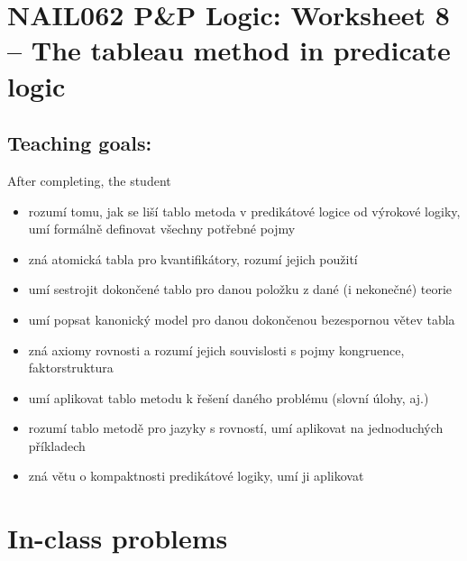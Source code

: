 \section*{NAIL062 P\&P Logic: Worksheet 8 -- The tableau method in predicate logic}


\subsection*{Teaching goals:} After completing, the student

    \begin{itemize}\setlength{\itemsep}{0pt}
        \item rozumí tomu, jak se liší tablo metoda v predikátové logice od výrokové logiky, umí formálně definovat všechny potřebné pojmy
        \item zná atomická tabla pro kvantifikátory, rozumí jejich použití
        \item umí sestrojit dokončené tablo pro danou položku z dané (i nekonečné) teorie
        \item umí popsat kanonický model pro danou dokončenou bezespornou větev tabla
        \item zná axiomy rovnosti a rozumí jejich souvislosti s pojmy kongruence, faktorstruktura
        \item umí aplikovat tablo metodu k řešení daného problému (slovní úlohy, aj.)
        \item rozumí tablo metodě pro jazyky s rovností, umí aplikovat na jednoduchých příkladech
        \item zná větu o kompaktnosti predikátové logiky, umí ji aplikovat
    \end{itemize}
    

\section*{In-class problems}
        
